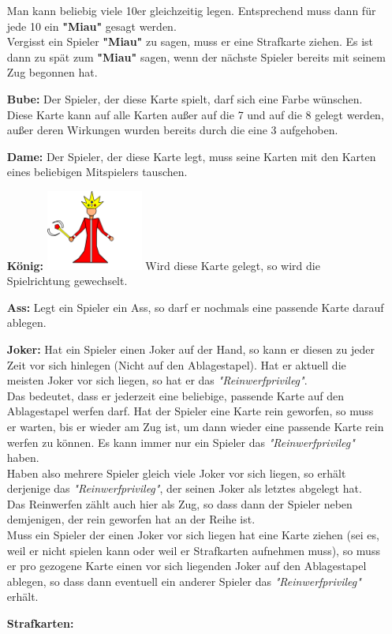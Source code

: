 \documentclass{article}
\begin{document}
\begin{itemize}
Man kann beliebig viele 10er gleichzeitig legen. Entsprechend muss dann für jede 10 ein \textbf{"Miau"} gesagt werden. \\ Vergisst ein Spieler \textbf{"Miau"} zu sagen, muss er eine Strafkarte ziehen. Es ist dann zu spät zum \textbf{"Miau"} sagen, wenn der nächste Spieler bereits mit seinem Zug begonnen hat.
\item[\textbf{Bube:}]
Der Spieler, der diese Karte spielt, darf sich eine Farbe wünschen. \\ Diese Karte kann auf alle Karten außer auf die 7 und auf die 8 gelegt werden, außer deren Wirkungen wurden bereits durch die eine 3 aufgehoben.
\item[\textbf{Dame:}]
Der Spieler, der diese Karte legt, muss seine Karten mit den Karten eines beliebigen Mitspielers tauschen.\item[\textbf{König:}]
\includegraphics[width=0.25\textwidth]{photos/Koenig.png}
Wird diese Karte gelegt, so wird die Spielrichtung gewechselt.
\item[\textbf{Ass:}] Legt ein Spieler ein Ass, so darf er nochmals eine passende Karte darauf ablegen. 
\item[\textbf{Joker:}]
Hat ein Spieler einen Joker auf der Hand, so kann er diesen zu jeder Zeit vor sich hinlegen (Nicht auf den Ablagestapel). Hat er aktuell die meisten Joker vor sich liegen, so hat er das \textit{"Reinwerfprivileg"}. \\
Das bedeutet, dass er jederzeit eine beliebige, passende Karte auf den Ablagestapel werfen darf. Hat der Spieler eine Karte rein geworfen, so muss er warten, bis er wieder am Zug ist, um dann wieder eine passende Karte rein werfen zu können. Es kann immer nur ein Spieler das \textit{"Reinwerfprivileg"} haben. \\
Haben also mehrere Spieler gleich viele Joker vor sich liegen, so erhält derjenige das \textit{"Reinwerfprivileg"}, der seinen Joker als letztes abgelegt hat.  \\
Das Reinwerfen zählt auch hier als Zug, so dass dann der Spieler neben demjenigen, der rein geworfen hat an der Reihe ist. \\
Muss ein Spieler der einen Joker vor sich liegen hat eine Karte ziehen (sei es, weil er nicht spielen kann oder weil er Strafkarten aufnehmen muss), so muss er pro gezogene Karte einen vor sich liegenden Joker auf den Ablagestapel ablegen, so dass dann eventuell ein anderer Spieler das \textit{"Reinwerfprivileg"} erhält.
\item[\textbf{Strafkarten:}]
\begin{itemize}



\end{itemize}
\end{itemize}
\end{document}
